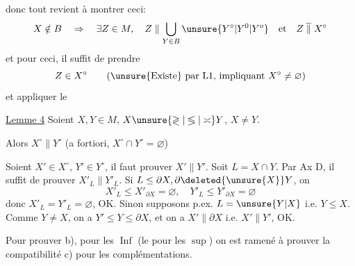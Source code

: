
donc tout revient à montrer ceci:
\[
X\notin B\quad\Rightarrow\quad\exists Z\in M,\quad Z\parallel\bigcup_{Y\in B}\unsure{Y^\circ|Y^0|Y^o}\quad\text{et}\quad Z\mathrel{\overline{\parallel}}X^\circ
\]
et pour ceci, il suffit de prendre
\[
Z\in X^\circ\qquad\text{(\unsure{Existe} par L1, impliquant }X^\circ\ne\varnothing\text{)}
\]
et appliquer le

\margin{$\big\vert\!\big\vert\!\big\vert$}
\uline{Lemme 4} Soient $X,Y\in M$, $X\unsure{\gtrless|\lessgtr|\asymp}Y$, $X\ne Y$.

Alors $X^\circ\parallel Y^\circ$ (a fortiori, $X^\circ\cap Y^\circ=\varnothing$)

Soient $X'\in X^\circ$, $Y'\in Y^\circ$, il faut prouver $X'\parallel Y'$.
Soit $L=X\cap Y$. Par Ax D, il suffit de prouver $X'_L\parallel Y'_L$. Si $L\leq\partial X,\partial\deleted{\unsure{X}}Y$,   on 
\[
X'_L\leq X'_{\partial X}=\varnothing,\quad Y'_L\leq Y'_{\partial X}=\varnothing
\]
donc $X'_L=Y'_L=\varnothing$, OK. Sinon  supposons p.ex. $L=\unsure{Y|X}$ i.e. $Y\leq X$. Comme $Y\ne X$, on a $Y'\leq Y\leq\partial X$, et on a $X'\parallel\partial X$ i.e. $X'\parallel Y'$, OK.

Pour prouver b),  pour les $\operatorname{Inf}$ (le  pour les $\operatorname{sup}$) on est ramené à prouver la  compatibilité c) pour les complémentations. 
